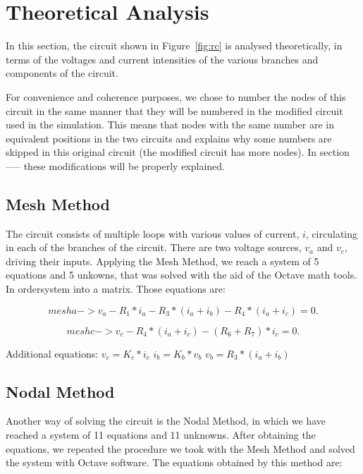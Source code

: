 \section{Theoretical Analysis}
\label{sec:analysis}

In this section, the circuit shown in Figure~\ref{fig:rc} is analysed
theoretically, in terms of the voltages and current intensities of the various branches and components of the circuit.

For convenience and coherence purposes, we chose to number the nodes of this circuit in the same manner that they will be numbered in the modified circuit used in the simulation. This means that nodes with the same number are in equivalent positions in the two circuits and explains why some numbers are skipped in this original circuit (the modified circuit has more nodes). In section ----- these modifications will be properly explained.

\subsection{Mesh Method}

The circuit consists of multiple loops with various values of current, $i$, circulating in each of the branches of the circuit. There are two
voltage sources, $v_a$ and $v_c$, driving their inputs. Applying the Mesh Method, we reach a system of 5 equations and 5 unkowns, that was solved with the aid of the Octave math tools. In ordersystem into a matrix. Those equations are:

\begin{equation}
  mesh a -> v_a - R_1*i_a - R_3*(i_a + i_b) - R_4*(i_a +i_c) = 0.
\end{equation}

\begin{equation}
  mesh c -> v_c - R_4*(i_a +i_c) - (R_6 +R_7)*i_c = 0.
\end{equation}

Additional equations:
$v_c = K_c*i_c$
$i_b = K_b*v_b$
$v_b = R_3*(i_a + i_b)$

\subsection{Nodal Method}

Another way of solving the circuit is the Nodal Method, in which we have reached a system of 11 equations and 11 unknowns. After obtaining the equations, we repeated the procedure we took with the Mesh Method and solved the system with Octave software. The equations obtained by this method are:

